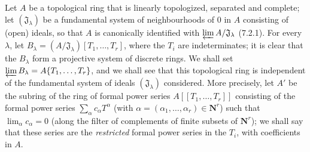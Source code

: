 \begin{env}[7.5.1]
\label{0.7.5.1}
Let $A$ be a topological ring that is linearly topologized, separated and complete;
let $(\mathfrak J_\lambda)$ be a fundamental system of neighbourhoods of $0$ in
$A$ consisting of (open) ideals, so that $A$ is canonically identified with
$\varprojlim A/\mathfrak J_\lambda$ (7.2.1). For every $\lambda$, let
$B_\lambda=(A/\mathfrak J_\lambda)[T_1,\ldots,T_r]$, where the $T_i$ are
indeterminates; it is clear that the $B_\lambda$ form a projective system
of discrete rings. We shall set
$\varprojlim B_\lambda=A\{T_1,\ldots,T_r\}$, and we shall see that this
topological ring is independent of the fundamental system of ideals
$(\mathfrak J_\lambda)$ considered. More precisely, let $A'$ be the subring
of the ring of formal power series $A[\![T_1,\ldots,T_r]\!]$ consisting of the formal
power series $\sum_\alpha c_\alpha T^\alpha$ (with
$\alpha=(\alpha_1,\ldots,\alpha_r)\in\mathbf{N}^r$) such that
$\lim_\alpha c_\alpha=0$ (along the filter of complements of finite
subsets of $\mathbf{N}^r$); we shall say that these series are the
\emph{restricted} formal power series in the $T_i$, with coefficients in $A$.



\end{env}
